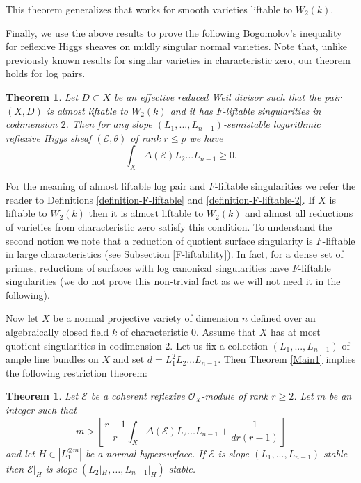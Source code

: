 \documentclass[12pt]{article}
\theoremstyle{plain}
\newtheorem{Theorem}[Thm]{\sc Theorem}
\theoremstyle{definition}
\theoremstyle{remark}
\newcommand{\cE}{{\mathcal E}}
\newcommand{\cO}{{\mathcal O}}
\begin{document}
This theorem generalizes \cite[Theorem 10]{La3} that works for smooth varieties liftable to $W_2(k)$. 

\medskip 

Finally, we use the above results to prove the following Bogomolov's inequality for reflexive Higgs sheaves on mildly singular normal varieties. Note that, unlike previously known results for singular varieties in characteristic zero, our theorem holds for log pairs.

\begin{Theorem} \label{Main3} 
	Let $D\subset X$ be an effective reduced Weil divisor such that the pair $(X,D)$ is almost liftable to $W_2(k)$ and it has  $F$-liftable singularities in codimension $2$. Then for any
	slope $(L_1,...,L_{n-1})$-semistable logarithmic reflexive Higgs sheaf $(\cE, \theta)$ of rank
	$r\le p$ we have
	$$\int_X \Delta (\cE) L_2...L_{n-1}\ge 0.$$
\end{Theorem}

For the meaning of almost liftable log pair and  $F$-liftable singularities  we refer the reader to Definitions \ref{definition-F-liftable} and \ref{definition-F-liftable-2}. If $X$ is liftable to $W_2(k)$ then it is almost liftable to $W_2(k)$ and almost all reductions of varieties from characteristic zero satisfy this condition. 
To understand the second notion we note that a reduction of  quotient surface singularity is $F$-liftable in large characteristics (see Subsection \ref{F-liftability}). In fact, for a dense set of primes, reductions of surfaces with log canonical singularities have $F$-liftable singularities (we do not prove this non-trivial fact as we will not need it in the following).

\medskip

Now let $X$ be a normal projective variety of dimension $n$ defined over an algebraically closed field $k$ of characteristic $0$. Assume that $X$ has at most quotient singularities in codimension $2$.
Let  us fix a collection $(L_1,...,L_{n-1})$ of ample line bundles on $X$ and  set  $d=L_1^2L_2...L_{n-1}$.   Then Theorem \ref{Main1} implies the following restriction theorem:

\begin{Theorem}\label{Main7}
	Let  $\cE$ be a coherent reflexive $\cO_X$-module of rank $r\ge 2$. Let  $m$ be an integer such that
	$$m>\left\lfloor \frac{r-1}{ r}\int_X\Delta (\cE)L_2\dots L_{n-1} +\frac{1}{dr(r-1)}
	\right\rfloor $$
	and let $H\in |L_1^{\otimes m}|$  be a normal hypersurface.
	If $\cE$ is slope $(L_1,...,L_{n-1})$-stable 	then $\cE|_H$ is  slope $(L_2|_H,\dots ,L_{n-1}|_H)$-stable.
\end{Theorem}
\end{document}
